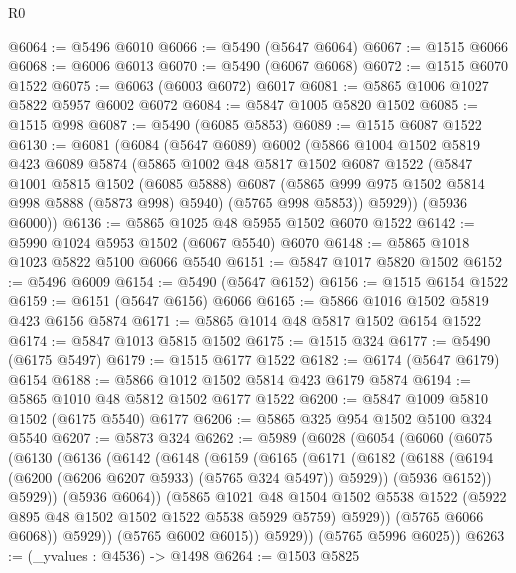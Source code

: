\begin{lexlean}{R0}
\begin{coremodule}
@6064 := @5496 @6010
@6066 := @5490 (@5647 @6064)
@6067 := @1515 @6066
@6068 := @6006 @6013
@6070 := @5490 (@6067 @6068)
@6072 := @1515 @6070 @1522
@6075 := @6063 (@6003 @6072) @6017
@6081 := @5865 @1006 @1027 @5822 @5957 @6002 @6072
@6084 := @5847 @1005 @5820 @1502
@6085 := @1515 @998
@6087 := @5490 (@6085 @5853)
@6089 := @1515 @6087 @1522
@6130 := @6081
    (@6084
      (@5647 @6089)
      @6002
      (@5866
        @1004
        @1502
        @5819
        @423
        @6089
        @5874
        (@5865
          @1002
          @48
          @5817
          @1502
          @6087
          @1522
          (@5847
            @1001
            @5815
            @1502
            (@6085 @5888)
            @6087
            (@5865 @999 @975 @1502 @5814 @998 @5888 (@5873 @998) @5940)
            (@5765 @998 @5853))
          @5929))
      (@5936 @6000))
@6136 := @5865 @1025 @48 @5955 @1502 @6070 @1522
@6142 := @5990 @1024 @5953 @1502 (@6067 @5540) @6070
@6148 := @5865 @1018 @1023 @5822 @5100 @6066 @5540
@6151 := @5847 @1017 @5820 @1502
@6152 := @5496 @6009
@6154 := @5490 (@5647 @6152)
@6156 := @1515 @6154 @1522
@6159 := @6151 (@5647 @6156) @6066
@6165 := @5866 @1016 @1502 @5819 @423 @6156 @5874
@6171 := @5865 @1014 @48 @5817 @1502 @6154 @1522
@6174 := @5847 @1013 @5815 @1502
@6175 := @1515 @324
@6177 := @5490 (@6175 @5497)
@6179 := @1515 @6177 @1522
@6182 := @6174 (@5647 @6179) @6154
@6188 := @5866 @1012 @1502 @5814 @423 @6179 @5874
@6194 := @5865 @1010 @48 @5812 @1502 @6177 @1522
@6200 := @5847 @1009 @5810 @1502 (@6175 @5540) @6177
@6206 := @5865 @325 @954 @1502 @5100 @324 @5540
@6207 := @5873 @324
@6262 := @5989
    (@6028
      (@6054
        (@6060
          (@6075
            (@6130
              (@6136
                (@6142
                  (@6148
                    (@6159
                      (@6165
                        (@6171
                          (@6182
                            (@6188 (@6194 (@6200 (@6206 @6207 @5933) (@5765 @324 @5497)) @5929))
                            (@5936 @6152))
                          @5929))
                      (@5936 @6064))
                    (@5865
                      @1021
                      @48
                      @1504
                      @1502
                      @5538
                      @1522
                      (@5922 @895 @48 @1502 @1502 @1522 @5538 @5929 @5759)
                      @5929))
                  (@5765 @6066 @6068))
                @5929))
            (@5765 @6002 @6015))
          @5929))
      (@5765 @5996 @6025))
@6263 := (_yvalues : @4536) -> @1498
@6264 := @1503 @5825

\end{coremodule}
\end{lexlean}
